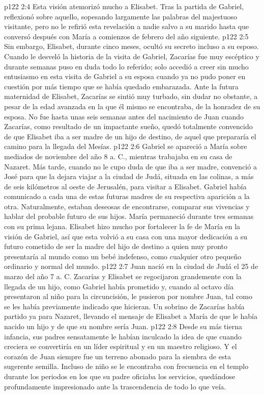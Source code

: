 \vs p122 2:4 Esta visión atemorizó mucho a Elisabet. Tras la partida de Gabriel, reflexionó sobre aquello, sopesando largamente las palabras del majestuoso visitante, pero no le refirió esta revelación a nadie salvo a su marido hasta que conversó después con María a comienzos de febrero del año siguiente.
\vs p122 2:5 \pc Sin embargo, Elisabet, durante cinco meses, ocultó su secreto incluso a su esposo. Cuando le desveló la historia de la visita de Gabriel, Zacarías fue muy escéptico y durante semanas puso en duda todo lo referido; solo accedió a creer sin mucho entusiasmo en esta visita de Gabriel a su esposa cuando ya no pudo poner en cuestión por más tiempo que se había quedado embarazada. Ante la futura maternidad de Elisabet, Zacarías se sintió muy turbado, sin dudar no obstante, a pesar de la edad avanzada en la que él mismo se encontraba, de la honradez de su esposa. No fue hasta unas seis semanas antes del nacimiento de Juan cuando Zacarías, como resultado de un impactante sueño, quedó totalmente convencido de que Elisabet iba a ser madre de un hijo de destino, de aquel que prepararía el camino para la llegada del Mesías.
\vs p122 2:6 Gabriel se apareció a María sobre mediados de noviembre del año 8 a. C., mientras trabajaba en su casa de Nazaret. Más tarde, cuando no le cupo duda de que iba a ser madre, convenció a José para que la dejara viajar a la ciudad de Judá, situada en las colinas, a más de seis kilómetros al oeste de Jerusalén, para visitar a Elisabet. Gabriel había comunicado a cada una de estas futuras madres de su respectiva aparición a la otra. Naturalmente, estaban deseosas de encontrarse, comparar sus vivencias y hablar del probable futuro de sus hijos. María permaneció durante tres semanas con su prima lejana. Elisabet hizo mucho por fortalecer la fe de María en la visión de Gabriel, así que esta volvió a su casa con una mayor dedicación a su futuro cometido de ser la madre del hijo de destino a quien muy pronto presentaría al mundo como un bebé indefenso, como cualquier otro pequeño ordinario y normal del mundo.
\vs p122 2:7 \pc Juan nació en la ciudad de Judá el 25 de marzo del año 7 a. C. Zacarías y Elisabet se regocijaron grandemente con la llegada de un hijo, como Gabriel había prometido y, cuando al octavo día presentaron al niño para la circuncisión, le pusieron por nombre Juan, tal como se les había previamente indicado que hicieran. Un sobrino de Zacarías había partido ya para Nazaret, llevando el mensaje de Elisabet a María de que le había nacido un hijo y de que su nombre sería Juan.
\vs p122 2:8 Desde su más tierna infancia, sus padres sensatamente le habían inculcado la idea de que cuando creciera se convertiría en un líder espiritual y en un maestro religioso. Y el corazón de Juan siempre fue un terreno abonado para la siembra de esta sugerente semilla. Incluso de niño se le encontraba con frecuencia en el templo durante los periodos en los que su padre oficiaba los servicios, quedándose profundamente impresionado ante la trascendencia de todo lo que veía.

